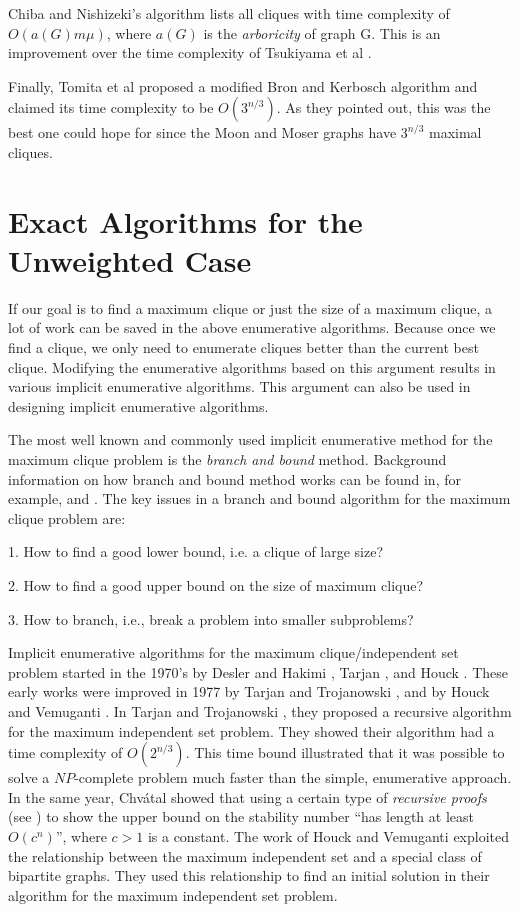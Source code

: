 Chiba and Nishizeki's \cite{ChNi85} algorithm lists all cliques with
time complexity of $O(a(G)m\mu)$, where $a(G)$ is the
{\em arboricity} of graph G. This is an improvement over the time
complexity of Tsukiyama et al \cite{TsIdAvSh77}.

Finally, Tomita et al \cite{ToTaTa88} proposed a modified Bron and
Kerbosch \cite{BrKe73} algorithm and claimed its time complexity to
be $O(3^{n/3})$. As they pointed out, this was the best one could
hope for since the Moon and Moser graphs \cite{MoMo65} have
$3^{n/3}$ maximal cliques.

\section{Exact Algorithms for the Unweighted Case}

If our goal is to find a maximum clique or just the size of a
maximum clique, a lot of work can be saved in the above
enumerative algorithms. Because once we find a clique, we only need
to enumerate cliques better than the current best clique. Modifying
the enumerative algorithms based on this argument results in various
implicit enumerative algorithms. This argument can also be used in
designing implicit enumerative algorithms. 


The most well known and commonly used implicit enumerative method
for the maximum clique problem is the {\em branch and bound} method.
Background information on how branch and bound method works can be found
in, for example, \cite{BaTo85} and \cite{NeWo88}. The key issues in
a branch and bound algorithm for the maximum clique problem are:

1. How to find a good lower bound, i.e. a clique of large size?

2. How to find a good upper bound on the size of maximum clique?

3. How to branch, i.e., break a problem into smaller subproblems?

Implicit enumerative algorithms for the maximum clique/independent
set problem started in the 1970's by Desler and Hakimi \cite{DeHa70},
Tarjan \cite{Tar72}, and Houck \cite{Hou74}. These early works were
improved in 1977 by Tarjan and Trojanowski \cite{TaTr77}, and by
Houck and Vemuganti \cite{HoVe77}. In Tarjan and Trojanowski
\cite{TaTr77}, they proposed a recursive algorithm for the maximum
independent set problem. They showed their algorithm had a time
complexity of $O(2^{n/3})$. This time bound illustrated that it was
possible to solve a $NP$-complete problem much faster than the
simple, enumerative approach. In the same year, Chv\'{a}tal
\cite{Chv77} showed that using a certain type of {\em recursive
proofs} (see \cite{Chv77}) to show the upper bound on the stability
number ``has length at least $O(c^{n})$'', where $c > 1$ is a
constant. The work of Houck and Vemuganti \cite{HoVe77} exploited
the relationship between the maximum independent set and a special
class of bipartite graphs. They used this relationship to find an
initial solution in their algorithm for the maximum independent set
problem.

